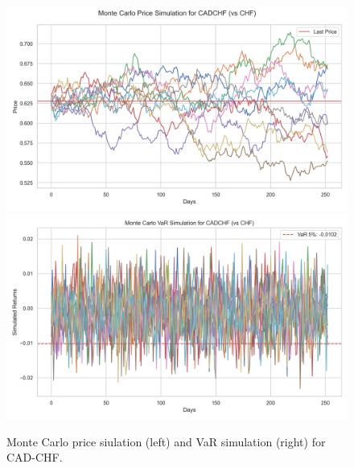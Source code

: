 \documentclass[a4paper, 12pt]{article}
\begin{document}
\begin{figure}
    \centering  \includegraphics[width=0.48\linewidth]{reports/figures/monte_carlo_price_simulation_CADCHF_vs_CHF.png} \label{fig:monte_carlo_price_simulation_CADCHF_vs_CHF}
    \includegraphics[width=0.48\linewidth]{reports/figures/monte_carlo_var_simulation_CADCHF_vs_CHF.png} \label{fig:monte_carlo_var_simulation_CADCHF_vs_CHF}
    \caption{\footnotesize Monte Carlo price siulation (left) and VaR simulation (right) for CAD-CHF.}
\end{figure}
\printbibliography
\end{document}
